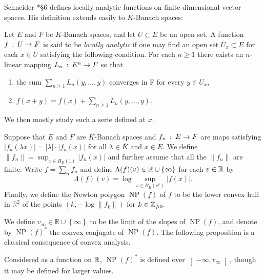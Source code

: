\documentclass{lms}
\DeclareMathOperator{\NP}{NP}
\begin{document}
Schneider \cite{schneider:11a}*{\S 6} defines locally analytic functions on finite dimensional vector spaces.
His definition extends easily to $K$-Banach spaces:

\begin{deftn} \label{deftn:analyticNP}
Let $E$ and $F$ be $K$-Banach spaces, and let $U \subset E$ be an open set.
A function $f \: : \: U \rightarrow F$ is said to be \emph{locally analytic} if one may find
an open set $U_x \subset E$ for each $x \in U$ satisfying the following condition.
For each $n \ge 1$ there exists an $n$-linear mapping
$L_n \: : \: E^n \rightarrow F$ so that 
\begin{enumerate}
\item the sum $\sum_{n \geq 1} L_n(y,\ldots,y)$ converges in F for every $y \in U_x,$ 
\item $f(x+y)=f(x)+\sum_{n \geq 1} L_n(y,\dots,y).$
\end{enumerate}
\end{deftn}

We then mostly study such a serie defined at $x$.

\begin{deftn} \label{deftn :  serie and norm}
Suppose that $E$ and $F$ are $\overline{K}$-Banach spaces and $f_n \: : \: E \to F$ are maps satisfying
$\lvert f_n(\lambda x) \rvert = \lvert \lambda \rvert \cdot \lvert f_n (x) \rvert$ for all $\lambda \in \overline{K}$ and $x \in E$.
We define $\lVert f_n \rVert = \sup_{x \in B_E(1)} \vert f_n(x) \vert$ and further assume that all the $\lVert f_n \rVert$ are finite.
Write $f = \sum_n f_n$ and define $\Lambda(f)(v) \in \mathbb R \cup \{\infty\}$ for each $v \in \mathbb R$ by
\[
\Lambda(f)(v) = \log \sup_{x \in B_E(e^v)} \vert f(x) \vert.
\]
Finally, we define the Newton polygon $\NP(f)$ of $f$ to be the lower convex hull in $\mathbb{R}^2$
of the points $(k, - \log \lVert f_k \rVert )$ for $k \in \mathbb Z_{\geqslant 0}.$ 
\end{deftn}

We define $v_\infty \in \mathbb{R} \cup \left\lbrace \infty \right\rbrace$ to be the limit of the slopes of $\NP(f)$, and
denote by $\NP(f)^*$ the convex conjugate of $\NP(f)$.  The following proposition is a classical consequence of convex analysis.

\begin{prop} \label{prop : conjugate Newton}
Considered as a function on $\mathbb R$, $\NP(f)^*$ is defined over $\left] -\infty,v_{\infty} \right[$, though it may be defined for larger values.
\end{prop}
\end{document}
